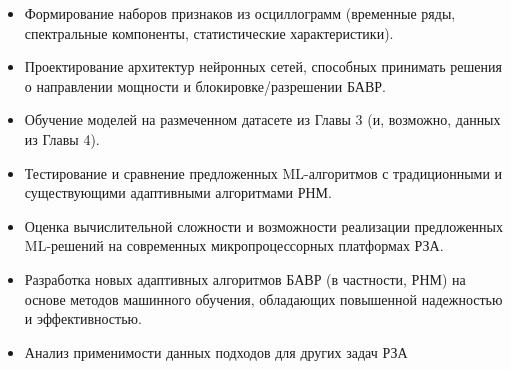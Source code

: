 \begin{itemize}
    \item Формирование наборов признаков из осциллограмм (временные ряды, спектральные компоненты, статистические характеристики).
    \item Проектирование архитектур нейронных сетей, способных принимать решения о направлении мощности и блокировке/разрешении БАВР.
    \item Обучение моделей на размеченном датасете из Главы 3 (и, возможно, данных из Главы 4).
    \item Тестирование и сравнение предложенных ML-алгоритмов с традиционными и существующими адаптивными алгоритмами РНМ.
    \item Оценка вычислительной сложности и возможности реализации предложенных ML-решений на современных микропроцессорных платформах РЗА.
    \item Разработка новых адаптивных алгоритмов БАВР (в частности, РНМ) на основе методов машинного обучения, обладающих повышенной надежностью и эффективностью.
    \item Анализ применимости данных подходов для других задач РЗА
\end{itemize}



\clearpage
